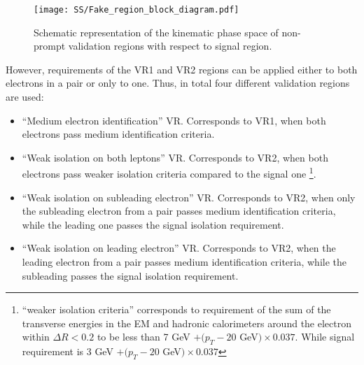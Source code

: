 \begin{figure}[h]
\begin{center}
\texttt{[image: SS/Fake\_region\_block\_diagram.pdf]}
\caption{Schematic representation of the kinematic phase space of non-prompt validation regions with respect to signal region.}
\label{fig:fake_validation_regions}
\end{center}
\end{figure}


However, requirements of the VR1 and VR2 regions can be applied either to both electrons in a pair or only to one.
Thus, in total four different validation regions are used:
\begin{itemize}
 \item ``Medium electron identification'' VR. Corresponds to VR1, when both electrons pass medium identification criteria.
 \item ``Weak isolation on both leptons'' VR. Corresponds to VR2, when both electrons pass weaker isolation criteria compared to the signal one 
 \footnote{``weaker isolation criteria'' corresponds to requirement of the sum of the transverse energies in the EM and hadronic calorimeters around the electron within $\Delta R < 0.2$ to be less than 7 GeV $+ (p_T - 20$ GeV$) \times 0.037$.
 While signal requirement is 3 GeV $+ (p_T - 20$ GeV$) \times 0.037$}.
 \item ``Weak isolation on subleading electron'' VR. Corresponds to VR2, when only the subleading electron from a pair passes medium identification criteria, while the leading one passes the signal isolation requirement.
 \item ``Weak isolation on leading electron'' VR. Corresponds to VR2, when the leading electron from a pair passes medium identification criteria, while the subleading passes the signal isolation requirement.
\end{itemize}

